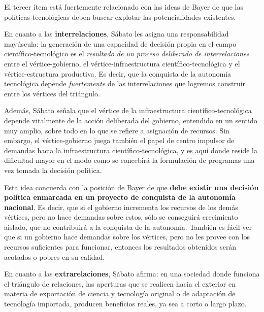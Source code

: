 El tercer ítem está fuertemente relacionado con las ideas de Bayer de que las políticas tecnológicas deben buscar explotar las potencialidades existentes.


\vspace{0.5em}

En cuanto a las \textbf{interrelaciones}, Sábato les asigna una responsabilidad mayúscula: la generación de una capacidad de decisión propia en el campo científico-tecnológico es el \textit{resultado de un proceso deliberado de interrelaciones} entre el vértice-gobierno, el vértice-infraestructura científico-tecnológica y el vértice-estructura productiva.
Es decir, que la conquista de la autonomía tecnológica depende \textit{fuertemente} de las interrelaciones que logremos construir entre los vértices del triángulo.

Además, Sábato señala que el vértice de la infraestructura científico-tecnológica depende vitalmente de la acción deliberada del gobierno, entendido en un sentido muy amplio, sobre todo en lo que se refiere a asignación de recursos. Sin embargo, el vértice-gobierno juega también el papel de centro impulsor de demandas hacia la infraestructura científico-tecnológica, y es aquí donde reside la dificultad mayor en el modo como se concebirá la formulación de programas una vez tomada la decisión política.

Esta idea concuerda con la posición de Bayer de que \textbf{debe existir una decisión política enmarcada en un proyecto de conquista de la autonomía nacional}. Es decir, que si el gobierno incrementa los recursos de los demás vértices, pero no hace demandas sobre estos, sólo se conseguirá crecimiento aislado, que no contribuirá a la conquista de la autonomía. También es fácil ver que si un gobierno hace demandas sobre los vértices, pero no les provee con los recursos suficientes para funcionar, entonces los resultados obtenidos serán acotados o pobres en su calidad.

\vspace{0.5em}

En cuanto a las \textbf{extrarelaciones}, Sábato afirma: en una sociedad donde funciona el triángulo de relaciones, las aperturas que se realicen hacia el exterior en materia de exportación de ciencia y tecnología original o de adaptación de tecnología importada, producen beneficios reales, ya sea a corto o largo plazo.

